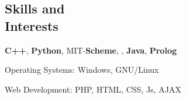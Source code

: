 \documentclass[margin,11pt]{resume}
\begin{document}
\begin{resume}
\section{\mysidestyle Skills and\\Interests} 
\begin{list2}
\item \textbf{C++}, \textbf{Python}, MIT-\textbf{Scheme}, \LaTeXe, \textbf{Java}, \textbf{Prolog}
\item Operating Systems: Windows, GNU/Linux
\item  Web Development: PHP, HTML, CSS, Js, AJAX
\end{list2}

\end{resume}
\end{document}
